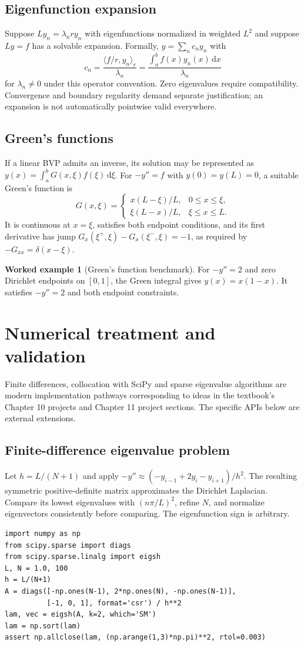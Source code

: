 \documentclass[11pt,letterpaper,oneside]{report}
\theoremstyle{definition}\newtheorem{definition}[theorem]{Definition}
\newtheorem{example}[theorem]{Worked example}
\theoremstyle{remark}\newtheorem{remark}[theorem]{Remark}
\newcommand{\dd}{\,\mathrm{d}}
\begin{document}
\section{Eigenfunction expansion}
Suppose $Ly_n=\lambda_n r y_n$ with eigenfunctions normalized in weighted $L^2$ and suppose $Ly=f$ has a solvable expansion. Formally, $y=\sum_n c_n y_n$ with
\[c_n=\frac{\langle f/r,y_n\rangle_r}{\lambda_n}=\frac{\int_a^b f(x)y_n(x)\dd x}{\lambda_n}\]
for $\lambda_n\ne0$ under this operator convention. Zero eigenvalues require compatibility. Convergence and boundary regularity demand separate justification; an expansion is not automatically pointwise valid everywhere.
\section{Green's functions}
If a linear BVP admits an inverse, its solution may be represented as $y(x)=\int_a^bG(x,\xi)f(\xi)\dd\xi$. For $-y''=f$ with $y(0)=y(L)=0$, a suitable Green's function is
\[G(x,\xi)=\begin{cases}x(L-\xi)/L,&0\le x\le\xi,\\\xi(L-x)/L,&\xi\le x\le L.\end{cases}\]
It is continuous at $x=\xi$, satisfies both endpoint conditions, and its first derivative has jump $G_x(\xi^+,\xi)-G_x(\xi^-,\xi)=-1$, as required by $-G_{xx}=\delta(x-\xi)$.
\begin{example}[Green's function benchmark]
For $-y''=2$ and zero Dirichlet endpoints on $[0,1]$, the Green integral gives $y(x)=x(1-x)$. It satisfies $-y''=2$ and both endpoint constraints.
\end{example}
\chapter{Numerical treatment and validation}
\begin{modern}Finite differences, collocation with SciPy and sparse eigenvalue algorithms are modern implementation pathways corresponding to ideas in the textbook's Chapter 10 projects and Chapter 11 project sections. The specific APIs below are external extensions.\end{modern}
\section{Finite-difference eigenvalue problem}
Let $h=L/(N+1)$ and apply $-y''\approx(-y_{i-1}+2y_i-y_{i+1})/h^2$. The resulting symmetric positive-definite matrix approximates the Dirichlet Laplacian. Compare its lowest eigenvalues with $(n\pi/L)^2$, refine $N$, and normalize eigenvectors consistently before comparing. The eigenfunction sign is arbitrary.
\begin{lstlisting}
import numpy as np
from scipy.sparse import diags
from scipy.sparse.linalg import eigsh
L, N = 1.0, 100
h = L/(N+1)
A = diags([-np.ones(N-1), 2*np.ones(N), -np.ones(N-1)],
          [-1, 0, 1], format='csr') / h**2
lam, vec = eigsh(A, k=2, which='SM')
lam = np.sort(lam)
assert np.allclose(lam, (np.arange(1,3)*np.pi)**2, rtol=0.003)
\end{lstlisting}
\end{document}
